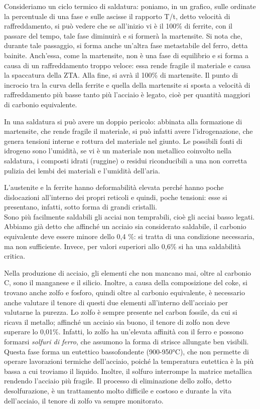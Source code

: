 Consideriamo un ciclo termico di saldatura: poniamo, in un grafico, sulle ordinate la percentuale di una fase e sulle ascisse il rapporto T/t, detto velocità di raffreddamento, si può vedere che se all’inizio vi è il 100\% di ferrite, con il passare del tempo, tale fase diminuirà e si formerà la martensite. Si nota che, durante tale passaggio, si forma anche un’altra fase metastabile del ferro, detta bainite. Anch’essa, come la martensite, non è una fase di equilibrio e si forma a causa di un raffreddamento troppo veloce: essa rende fragile il materiale e causa la spaccatura della ZTA. Alla fine, si avrà il 100\% di martensite. Il punto di incrocio tra la curva della ferrite e quella della martensite si sposta a velocità di raffreddamento più basse tanto più l’acciaio è legato, cioè per quantità maggiori di carbonio equivalente.

In una saldatura si può avere un doppio pericolo: abbinata alla formazione di martensite, che rende fragile il materiale, si può infatti avere l’idrogenazione, che genera tensioni interne e rottura del materiale nel giunto. Le possibili fonti di idrogeno sono l’umidità, se vi è un materiale non metallico coinvolto nella saldatura, i composti idrati (ruggine) o residui riconducibili a una non corretta pulizia dei lembi dei materiali e l’umidità dell’aria.

L’austenite e la ferrite hanno deformabilità elevata perché hanno poche dislocazioni all’interno dei propri reticoli e quindi, poche tensioni: esse si presentano, infatti, sotto forma di grandi cristalli.\\
Sono più facilmente saldabili gli acciai non temprabili, cioè gli acciai basso legati.
Abbiamo già detto che affinché un acciaio sia considerato saldabile, il carbonio equivalente deve essere minore dello 0,4 \%: si tratta di una condizione necessaria, ma non sufficiente. Invece, per valori superiori allo 0,6\% si ha una saldabilità critica.

Nella produzione di acciaio, gli elementi che non mancano mai, oltre al carbonio C, sono il manganese e il silicio. Inoltre, a causa della composizione del coke, si trovano anche zolfo e fosforo, quindi oltre al carbonio equivalente, è necessario anche valutare il tenore di questi due elementi all’interno dell’acciaio per valutarne la purezza.
Lo zolfo è sempre presente nel carbon fossile, da cui si ricava il metallo; affinché un acciaio sia buono, il tenore di zolfo non deve superare lo 0,01\%. Infatti, lo zolfo ha un’elevata affinità con il ferro e possono formarsi \textit{solfuri di ferro}, che assumono la forma di strisce allungate ben visibili. Questa fase forma un eutettico bassofondente (900-950°C), che non permette di operare lavorazioni termiche dell’acciaio, poiché la temperatura eutettica è la più bassa a cui troviamo il liquido. Inoltre, il solfuro interrompe la matrice metallica rendendo l’acciaio più fragile.
Il processo di eliminazione dello zolfo, detto desolfurazione, è un trattamento molto difficile e costoso e durante la vita dell’acciaio, il tenore di zolfo va sempre monitorato.

